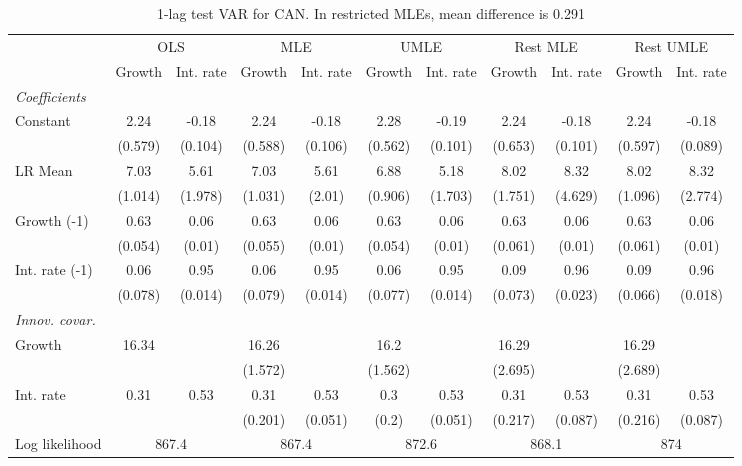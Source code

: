 \begin{table}[htbp] 
	\centering
	\begin{tabular}{@{\extracolsep{4pt}}lcccccccccc@{}}		\hline\hline
		 		 & \multicolumn{2}{c}{OLS} &\multicolumn{2}{c}{MLE} &\multicolumn{2}{c}{UMLE} &\multicolumn{2}{c}{Rest MLE} &\multicolumn{2}{c}{Rest UMLE} \\ 
 		 & Growth 	 & Int. rate 	 & Growth 	 & Int. rate 	 & Growth 	 & Int. rate 	 & Growth 	 & Int. rate 	 & Growth 	 & Int. rate\\\cline{2-3}\cline{4-5}\cline{6-7}\cline{8-9}\cline{10-11}
\rule{0pt}{4ex} 
 \emph{Coefficients} 	  		 & 		 & 		 & 		 & 		 & 		 & 		 & 		 & 		 & 		 &\\ 
\quad Constant 	 & 2.24 	 & -0.18 	 & 2.24 	 & -0.18 	 & 2.28 	 & -0.19 	 & 2.24 	 & -0.18 	 & 2.24 	 & -0.18	 \\ 
 		 & (0.579) 	 & (0.104) 	 & (0.588) 	 & (0.106) 	 & (0.562) 	 & (0.101) 	 & (0.653) 	 & (0.101) 	 & (0.597) 	 & (0.089) 	 \\ 
\quad LR Mean 	 & 7.03 	 & 5.61 	 & 7.03 	 & 5.61 	 & 6.88 	 & 5.18 	 & 8.02 	 & 8.32 	 & 8.02 	 & 8.32	 \\ 
 		 & (1.014) 	 & (1.978) 	 & (1.031) 	 & (2.01) 	 & (0.906) 	 & (1.703) 	 & (1.751) 	 & (4.629) 	 & (1.096) 	 & (2.774) 	 \\ 
\quad Growth (-1) 	 &0.63 	 & 0.06 	 & 0.63 	 & 0.06 	 & 0.63 	 & 0.06 	 & 0.63 	 & 0.06 	 & 0.63 	 & 0.06	 \\ 
 		 & (0.054) 	 & (0.01) 	 & (0.055) 	 & (0.01) 	 & (0.054) 	 & (0.01) 	 & (0.061) 	 & (0.01) 	 & (0.061) 	 & (0.01) 	 \\ 
\quad Int. rate (-1) 	 &0.06 	 & 0.95 	 & 0.06 	 & 0.95 	 & 0.06 	 & 0.95 	 & 0.09 	 & 0.96 	 & 0.09 	 & 0.96	 \\ 
 		 & (0.078) 	 & (0.014) 	 & (0.079) 	 & (0.014) 	 & (0.077) 	 & (0.014) 	 & (0.073) 	 & (0.023) 	 & (0.066) 	 & (0.018) 	 \\ 
\rule{0pt}{4ex} \emph{Innov. covar.}  	 & 	 & 	 & 	 & 	 & 	 & 	 & 	 & 	 & 	 &\\ 
\quad Growth 	 &16.34 	 &  	 & 16.26 	 &  	 & 16.2 	 &  	 & 16.29 	 &  	 & 16.29 	 & 	 \\ 
 		 &  	 &  	 & (1.572) 	 &  	 & (1.562) 	 &  	 & (2.695) 	 &  	 & (2.689) 	 &  	 \\ 
\quad Int. rate 	 &0.31 	 & 0.53 	 & 0.31 	 & 0.53 	 & 0.3 	 & 0.53 	 & 0.31 	 & 0.53 	 & 0.31 	 & 0.53	 \\ 
 		 &  	 &  	 & (0.201) 	 & (0.051) 	 & (0.2) 	 & (0.051) 	 & (0.217) 	 & (0.087) 	 & (0.216) 	 & (0.087) 	 \\ 
 \hline \rule{0pt}{4ex} 
  Log likelihood 	 &\multicolumn{2}{c}{867.4} 	 & \multicolumn{2}{c}{867.4} 	 & \multicolumn{2}{c}{872.6} 	 & \multicolumn{2}{c}{868.1} 	 & \multicolumn{2}{c}{874}\\ 

 \hline 	\end{tabular}		\caption{1-lag test VAR for CAN. In restricted MLEs, mean difference is 0.291}
		\label{tab:CAN1lag}

\end{table}
